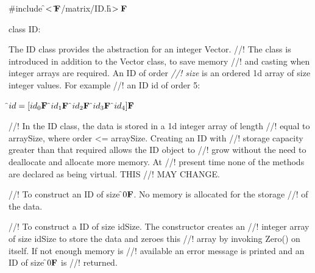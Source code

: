 
\indent \#include \f$<\tilde{ }{\bf F}$/matrix/ID.h\f$>{\bf F}$

\indent class ID:


\indent The ID class provides the abstraction for an integer Vector. 
//! The class is introduced in addition to the Vector class, to save memory
//! and casting when integer arrays are required. An ID of order {\em
//! size} is an ordered 1d array of \p size integer values. For example
//! an ID id of order 5:

\indent\indent \f$id = [id_0{\bf F}$ \f$id_1{\bf F}$ \f$id_2{\bf F}$ \f$id_3{\bf F}$ \f$id_4]{\bf F}$

//! In the ID class, the data is stored in a 1d integer array of length
//! equal to arraySize, where order <= arraySize. Creating an ID with
//! storage capacity greater than that required allows the ID object to
//! grow without the need to deallocate and allocate more memory. At
//! present time none of the methods are declared as being virtual. THIS
//! MAY CHANGE.




//! To construct an ID of size \f$0{\bf F}$. No memory is allocated for the storage
//! of the data.

//! To construct a ID of size \p idSize. The constructor creates an
//! integer array of size \p idSize to store the data and zeroes this
//! array by invoking Zero() on itself. If not enough memory is
//! available an error message is printed and an ID of size \f$0{\bf F}$ is
//! returned.  

